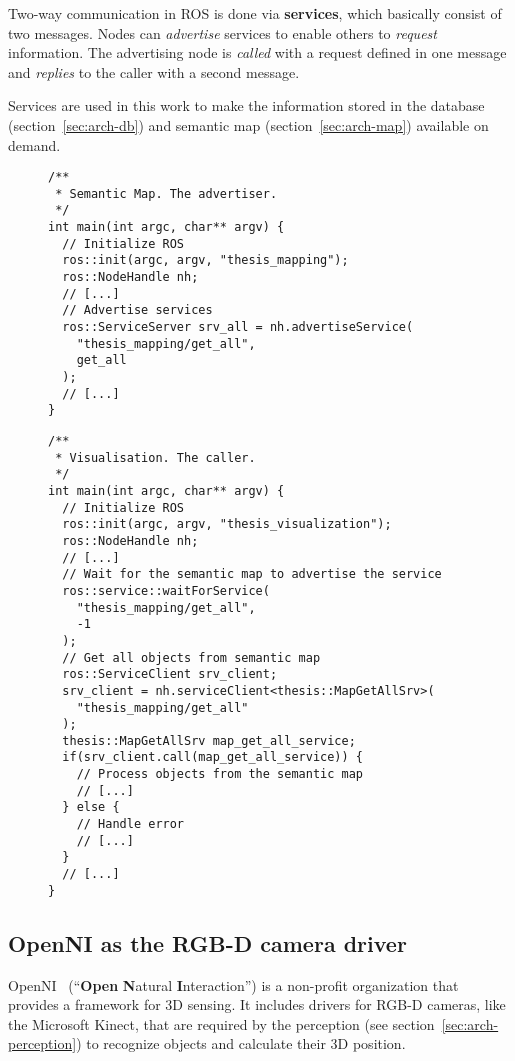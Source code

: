 Two-way communication in ROS is done via \textbf{services}, which basically consist of two messages. Nodes can \textit{advertise} services to enable others to \textit{request} information. The advertising node is \textit{called} with a request defined in one message and \textit{replies} to the caller with a second message.

Services are used in this work to make the information stored in the database (section~\ref{sec:arch-db}) and semantic map (section~\ref{sec:arch-map}) available on demand.

\begin{figure}[H]
  \begin{lstlisting}[caption=An example for the use of ROS services in this work. The semantic map enables others to get memorized objects.]
/**
 * Semantic Map. The advertiser.
 */
int main(int argc, char** argv) {
  // Initialize ROS
  ros::init(argc, argv, "thesis_mapping");
  ros::NodeHandle nh;
  // [...]
  // Advertise services
  ros::ServiceServer srv_all = nh.advertiseService(
    "thesis_mapping/get_all",
    get_all
  );
  // [...]
}
  \end{lstlisting}
\end{figure}

\begin{figure}[H]
  \begin{lstlisting}[caption=An example for the use of ROS services in this work. The visualisation gets all objects memorized by the semantic map.]
/**
 * Visualisation. The caller.
 */
int main(int argc, char** argv) {
  // Initialize ROS
  ros::init(argc, argv, "thesis_visualization");
  ros::NodeHandle nh;
  // [...]
  // Wait for the semantic map to advertise the service
  ros::service::waitForService(
    "thesis_mapping/get_all",
    -1
  );
  // Get all objects from semantic map
  ros::ServiceClient srv_client;
  srv_client = nh.serviceClient<thesis::MapGetAllSrv>(
    "thesis_mapping/get_all"
  );
  thesis::MapGetAllSrv map_get_all_service;
  if(srv_client.call(map_get_all_service)) {
    // Process objects from the semantic map
    // [...]
  } else {
    // Handle error
    // [...]
  }
  // [...]
}
  \end{lstlisting}
\end{figure}

\subsection{OpenNI as the RGB-D camera driver}
\label{sec:impl-openni}
OpenNI~\cite{openni_sdk} (``\textbf{Open} \textbf{N}atural \textbf{I}nteraction'') is a non-profit organization that provides a framework for 3D sensing. It includes drivers for RGB-D cameras, like the Microsoft Kinect, that are required by the perception (see section~\ref{sec:arch-perception}) to recognize objects and calculate their 3D position. \\

